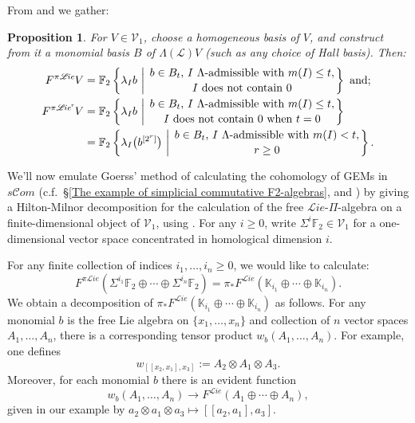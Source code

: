 \documentclass[11pt]{amsart} \renewcommand{\baselinestretch}{1.4}
\theoremstyle{plain}
\newtheorem{prop}[thm]{Proposition}
\theoremstyle{definition}
\renewcommand{\to}{\longrightarrow}
\newcommand{\scrL}{\mathscr{L}}
\newcommand{\scrC}{\mathscr{C}}
\newcommand{\calV}{\mathcal{V}}
\newcommand{\citeBOX}[2][]{\cite[\mbox{#1}]{#2}}
\newcommand{\LieOperad}{{\scrL}}
\newcommand{\restnRepeated}[2]{#1^{[2^{#2}]}}
\newcommand{\vect}[2]{\calV^{#1}_{#2}}
\newcommand{\PA}[1]{\pi#1}
\newcommand{\minDimDelta}{m}
\newcommand{\F}{\mathbb{F}}
\newcommand{\algs}{{\scrC\!\textit{om}}}
\newcommand{\liealgs}{{\scrL\!\textit{ie}}}
\newcommand{\restliealgs}{{\scrL\!\textit{ie}^\textit{r}}}
\newcommand{\Ftwo}{\F_2}
\renewcommand{\mapsto}{\longmapsto}
\begin{document}
\begin{Constructing homotopy operations}
From  \cite[Theorem 8.8 and proof]{CurtisSimplicialHtpy.pdf} and \cite{6Author.pdf} we gather:
\begin{prop}
\label{Lie homotopy operations}
For $V\in\vect{}{1}$,   choose a homogeneous basis of $V$, and construct from it a monomial  basis $B$ of $\Lambda(\LieOperad)V$ (such as any choice of Hall basis). Then:
\begin{align*}
F^{\PA{\liealgs}}V&=\Ftwo \left\{\lambda_Ib\ \middle|\ \genfrac{}{}{0pt}{}{b\in B_t\textup{, $I$ $\Lambda$-admissible with }\minDimDelta(I)\leq t,}{\textup{$I$ does not contain 0}}\right\}\textup{ and;}
\\
F^{\PA{\restliealgs}}V&=\Ftwo \left\{\lambda_Ib\ \middle|\ \genfrac{}{}{0pt}{}{b\in B_t\textup{, $I$ $\Lambda$-admissible with }\minDimDelta(I)\leq t,}{\textup{$I$ does not contain 0 when $t=0$}}\right\}
\\
&=\Ftwo \left\{\lambda_I\bigl(\restnRepeated{b}{r}\bigr)\ \middle|\ \genfrac{}{}{0pt}{}{b\in B_t\textup{, $I$ $\Lambda$-admissible with }\minDimDelta(I)< t,}{\textup{$r\geq0$}}\right\}.
\end{align*}
\end{prop}
We'll now emulate  Goerss' method of calculating the cohomology of GEMs in $s\algs$ (c.f.\ \S\ref{The example of simplicial commutative F2-algebras}, \cite{GoerssHiltonMilnor.pdf} and \citeBOX[\S11]{MR1089001}) by giving a Hilton-Milnor decomposition for the calculation of the free $\liealgs$-$\Pi$-algebra on a finite-dimensional object of $\vect{}{1}$, using \cite[Proposition 3.1]{Schles-SimpLieRing.pdf}. For any $i\geq0$, write $\Sigma^i\Ftwo \in\vect{}{1}$ for a one-dimensional vector space concentrated in homological dimension $i$.

For any finite collection of indices $i_1,\ldots,i_n\geq 0$, we would like to calculate:
\[F^{\PA{\liealgs}}(\Sigma^{i_1}\Ftwo\oplus\cdots \oplus\Sigma^{i_n}\Ftwo)=\pi_*F^\liealgs(\mathbb{K}_{i_1}\oplus\cdots \oplus \mathbb{K}_{i_n}).\]
We obtain a decomposition of $\pi_*F^\liealgs(\mathbb{K}_{i_1}\oplus\cdots \oplus \mathbb{K}_{i_n})$ as follows. For any monomial $b$ is the free Lie algebra on $\{x_1,\ldots,x_n\}$ and collection of $n$ vector spaces $A_{1},\ldots,A_n$, there is a corresponding tensor product $w_b(A_{1},\ldots,A_n)$. For example, one defines
\[w_{[[x_2,x_1],x_3]}:=A_2\otimes A_1\otimes A_3.\]
Moreover, for each monomial $b$ there is an evident function \[w_b(A_1,\ldots,A_n)\to F^\liealgs(A_1\oplus\cdots\oplus A_n),\]
given in our example by $a_2\otimes a_1\otimes a_3\mapsto [[a_2,a_1],a_3]$.


\end{Constructing homotopy operations}
\end{document}
